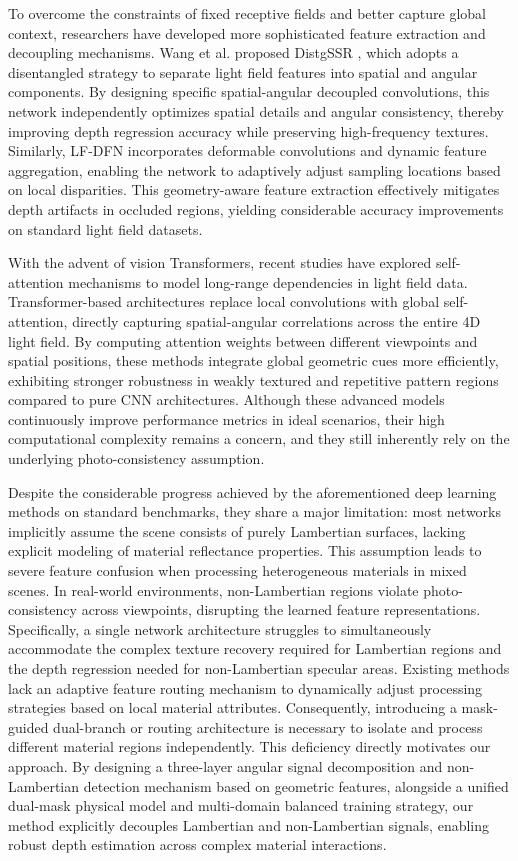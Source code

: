 \documentclass[lettersize,journal]{IEEEtran}
\begin{document}
To overcome the constraints of fixed receptive fields and better capture global context, researchers have developed more sophisticated feature extraction and decoupling mechanisms. Wang et al. proposed DistgSSR , which adopts a disentangled strategy to separate light field features into spatial and angular components. By designing specific spatial-angular decoupled convolutions, this network independently optimizes spatial details and angular consistency, thereby improving depth regression accuracy while preserving high-frequency textures. Similarly, LF-DFN  incorporates deformable convolutions and dynamic feature aggregation, enabling the network to adaptively adjust sampling locations based on local disparities. This geometry-aware feature extraction effectively mitigates depth artifacts in occluded regions, yielding considerable accuracy improvements on standard light field datasets.

With the advent of vision Transformers, recent studies have explored self-attention mechanisms to model long-range dependencies in light field data. Transformer-based architectures  replace local convolutions with global self-attention, directly capturing spatial-angular correlations across the entire 4D light field. By computing attention weights between different viewpoints and spatial positions, these methods integrate global geometric cues more efficiently, exhibiting stronger robustness in weakly textured and repetitive pattern regions compared to pure CNN architectures. Although these advanced models continuously improve performance metrics in ideal scenarios, their high computational complexity remains a concern, and they still inherently rely on the underlying photo-consistency assumption.

Despite the considerable progress achieved by the aforementioned deep learning methods on standard benchmarks, they share a major limitation: most networks implicitly assume the scene consists of purely Lambertian surfaces, lacking explicit modeling of material reflectance properties. This assumption leads to severe feature confusion when processing heterogeneous materials in mixed scenes. In real-world environments, non-Lambertian regions violate photo-consistency across viewpoints, disrupting the learned feature representations. Specifically, a single network architecture struggles to simultaneously accommodate the complex texture recovery required for Lambertian regions and the depth regression needed for non-Lambertian specular areas. Existing methods lack an adaptive feature routing mechanism to dynamically adjust processing strategies based on local material attributes. Consequently, introducing a mask-guided dual-branch or routing architecture is necessary to isolate and process different material regions independently. This deficiency directly motivates our approach. By designing a three-layer angular signal decomposition and non-Lambertian detection mechanism based on geometric features, alongside a unified dual-mask physical model and multi-domain balanced training strategy, our method explicitly decouples Lambertian and non-Lambertian signals, enabling robust depth estimation across complex material interactions.
\end{document}
